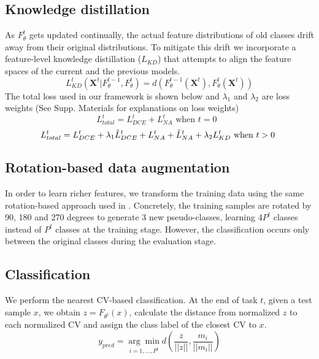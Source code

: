 \documentclass[10pt,twocolumn,letterpaper]{article}
\begin{document}
\subsection{Knowledge distillation}
As $F_\theta^{t}$ gets updated continually, the actual feature distributions of old classes drift away from their original distributions. To mitigate this drift we incorporate a feature-level knowledge distillation ($L_{KD}$) \cite{Zhu2021PrototypeLearning, Zhu2021Class-IncrementalAugmentation} that attempts to align the feature spaces of the current and  the previous models.
 \begin{equation}
L_{KD}^t(\mathbf{X}^t|F_\theta^{t-1},F_\theta^t) = d(F_\theta^{t-1}(\mathbf{X}^t),F_\theta^t(\mathbf{X}^t))
\label{eq:kd}
 \end{equation}
The total loss used in our framework is shown below and $\lambda_1$ and $\lambda_2$ are loss weights (See Supp. Materials for explanations on loss weights)
\begin{equation}
L_{total}^t = L_{DCE}^t + L_{NA}^t \text{ when $t=0$ }
\end{equation}
\begin{equation}
L_{total}^t = L_{DCE}^t + \lambda_1 \Hat{L}_{DCE}^t + 
L_{NA}^t+\Hat{L}_{NA}^t+ \lambda_2 L_{KD}^t 
\text{ when $t>0$ } \nonumber
\end{equation}

\subsection{Rotation-based data augmentation}
In order to learn richer features, we transform the training data using the same rotation-based approach used in \cite{Zhu2021PrototypeLearning}. Concretely, the training samples are rotated by 90, 180 and 270 degrees to generate 3 new pseudo-classes, learning $4P^t$ classes instead of $P^t$ classes at the training stage. However, the classification occurs only between the original classes during the evaluation stage.

\subsection{Classification}
We perform the nearest CV-based classification. At the end of task $t$, given a test sample $x$, we obtain $z= F_{\theta^t}(x)$, calculate the distance from normalized $z$ to each normalized CV and assign the class label of the closest CV to $x$. 
\begin{equation}
    y_{pred} =  \underset{i=1,...,P^t }{\arg\min}d(\frac{z}{||z||},\frac{m_i}{||m_i||})
\end{equation}
\end{document}
